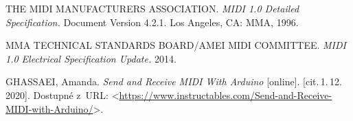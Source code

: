 

\begin{thebibliography}{99}

    THE MIDI MANUFACTURERS ASSOCIATION. \emph{MIDI 1.0 Detailed Specification.} Document Version 4.2.1. Los Angeles, CA: MMA, 1996.

    MMA TECHNICAL STANDARDS BOARD/AMEI MIDI COMMITTEE. \emph{MIDI 1.0 Electrical Specification Update.} 2014.

    GHASSAEI, Amanda. \emph{Send and Receive MIDI With Arduino}\/ [online]. [cit.\,1.\,12.\,2020]. Dostupné z~URL: <\url{https://www.instructables.com/Send-and-Receive-MIDI-with-Arduino/}>.
	

\end{thebibliography}

